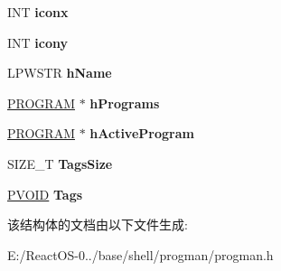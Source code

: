 \begin{DoxyCompactItemize}
\mbox{\label{struct___p_r_o_g_g_r_o_u_p_a68a98337071219a4eeac4a1c6f253aa4}} 
I\+NT {\bfseries iconx}
\item 
\mbox{\label{struct___p_r_o_g_g_r_o_u_p_af5cd91ff1e9325c6e4153979ddb29891}} 
I\+NT {\bfseries icony}
\item 
\mbox{\label{struct___p_r_o_g_g_r_o_u_p_a60db079d16e3872aceaab47c624334df}} 
L\+P\+W\+S\+TR {\bfseries h\+Name}
\item 
\mbox{\label{struct___p_r_o_g_g_r_o_u_p_a1d4a0f06460ae7f07a63550ca153824e}} 
\hyperlink{struct___p_r_o_g_r_a_m}{P\+R\+O\+G\+R\+AM} $\ast$ {\bfseries h\+Programs}
\item 
\mbox{\label{struct___p_r_o_g_g_r_o_u_p_a4c61acb3925e7861eb86f9a876b7e511}} 
\hyperlink{struct___p_r_o_g_r_a_m}{P\+R\+O\+G\+R\+AM} $\ast$ {\bfseries h\+Active\+Program}
\item 
\mbox{\label{struct___p_r_o_g_g_r_o_u_p_afc9710cbef725d386ffeb4f33ab00ffb}} 
S\+I\+Z\+E\+\_\+T {\bfseries Tags\+Size}
\item 
\mbox{\label{struct___p_r_o_g_g_r_o_u_p_add706b161a4870cdf715cc8305c5c563}} 
\hyperlink{interfacevoid}{P\+V\+O\+ID} {\bfseries Tags}
\end{DoxyCompactItemize}


该结构体的文档由以下文件生成\+:\begin{DoxyCompactItemize}
\item 
E\+:/\+React\+O\+S-\/0../base/shell/progman/progman.\+h\end{DoxyCompactItemize}

